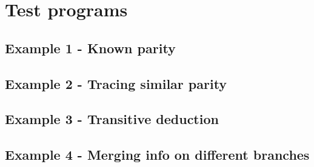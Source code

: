 \newpage
\section*{Test programs}
\subsection*{Example 1 - Known parity}
\newpage
\subsection*{Example 2 - Tracing similar parity}
\newpage
\subsection*{Example 3 - Transitive deduction}
\subsection*{Example 4 - Merging info on different branches}

